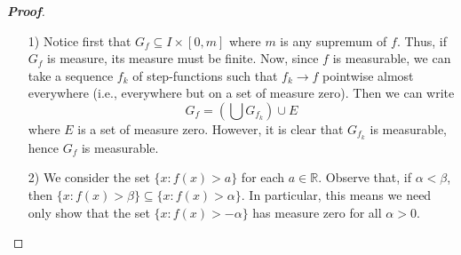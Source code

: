 \documentclass[12pt,leqno]{book}
\theoremstyle{definition}
\newcommand{\R}{\mathbb{R}}
\newenvironment{Proof}{\begin{proof}[\textnormal{\textbf{Proof}}]}{\end{proof}}
\begin{document}
\begin{enumerate}
\begin{Proof}
\begin{enumerate}
   \item [1)] Notice first that $G_f\subseteq I\times[0,m]$ where $m$ is any supremum of $f$. Thus, if $G_f$ is measure, its measure must be finite. Now, since $f$ is measurable, we can take a sequence $f_k$ of step-functions such that $f_k\to f$ pointwise almost everywhere (i.e., everywhere but on a set of measure zero). Then we can write \[G_f=\left(\bigcup G_{f_k}\right)\cup E\] where $E$ is a set of measure zero. However, it is clear that $G_{f_k}$ is measurable, hence $G_f$ is measurable.
   \item [2)] We consider the set $\{x:f(x)>a\}$ for each $a\in\R$. Observe that, if $\alpha<\beta$, then $\{x:f(x)>\beta\}\subseteq\{x:f(x)>\alpha\}$. In particular, this means we need only show that the set $\{x:f(x)>-\alpha\}$ has measure zero for all $\alpha>0$. 
  \end{enumerate}

 \end{Proof}

\end{enumerate}
\end{document}
